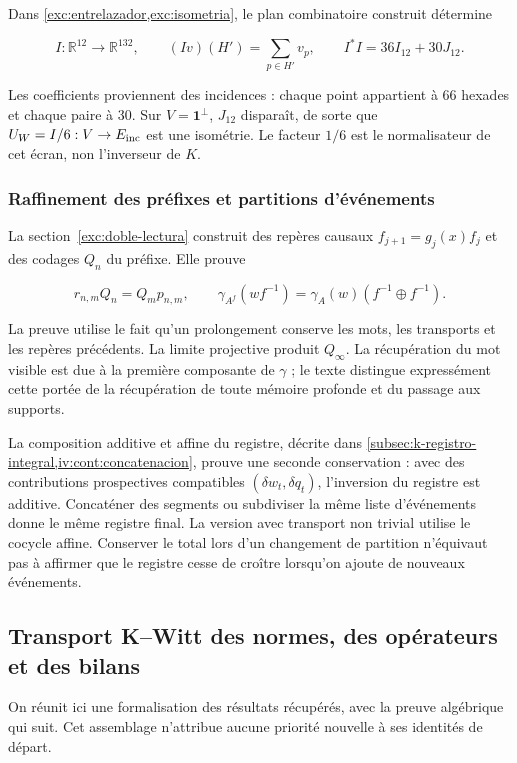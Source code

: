Dans \cref{exc:entrelazador,exc:isometria}, le plan combinatoire construit détermine

\[
I:\mathbb R^{12}\to\mathbb R^{132},\qquad
(Iv)(H')=\sum_{p\in H'}v_p,\qquad I^*I=36I_{12}+30J_{12}.
\]

Les coefficients proviennent des incidences : chaque point appartient à 66 hexades et chaque paire à 30. Sur \(V=\mathbf1^\perp\), \(J_{12}\) disparaît, de sorte que \(U_W=I/6:V\to E_{\rm inc}\) est une isométrie. Le facteur \(1/6\) est le normalisateur de cet écran, non l’inverseur de \(K\).

\subsubsection{Raffinement des préfixes et partitions d’événements}

La section~\ref{exc:doble-lectura} construit des repères causaux \(f_{j+1}=g_j(x)f_j\) et des codages \(Q_n\) du préfixe. Elle prouve

\[
r_{n,m}Q_n=Q_mp_{n,m},\qquad
\gamma_{A^f}(wf^{-1})=\gamma_A(w)(f^{-1}\oplus f^{-1}).
\]

La preuve utilise le fait qu’un prolongement conserve les mots, les transports et les repères précédents. La limite projective produit \(Q_\infty\). La récupération du mot visible est due à la première composante de \(\gamma\) ; le texte distingue expressément cette portée de la récupération de toute mémoire profonde et du passage aux supports.

La composition additive et affine du registre, décrite dans \cref{subsec:k-registro-integral,iv:cont:concatenacion}, prouve une seconde conservation : avec des contributions prospectives compatibles \((\delta w_t,\delta q_t)\), l’inversion du registre est additive. Concaténer des segments ou subdiviser la même liste d’événements donne le même registre final. La version avec transport non trivial utilise le cocycle affine. Conserver le total lors d’un changement de partition n’équivaut pas à affirmer que le registre cesse de croître lorsqu’on ajoute de nouveaux événements.


\subsection{Transport K–Witt des normes, des opérateurs et des bilans}\label{nuc04:kwitt}

On réunit ici une formalisation des résultats récupérés, avec la preuve algébrique qui suit. Cet assemblage n’attribue aucune priorité nouvelle à ses identités de départ.

